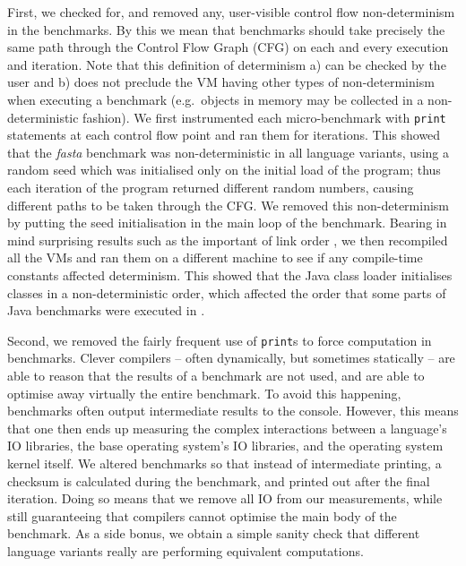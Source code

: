 \documentclass[10pt,preprint]{sigplanconf}
\newcommand{\fasta}{\emph{fasta}\xspace}
\begin{document}
First, we checked for, and removed any, user-visible control flow
non-determinism in the benchmarks. By this we mean that benchmarks should take
precisely the same path through the Control Flow Graph (CFG) on each and every
execution and iteration. Note that
this definition of determinism a) can be checked by the user and b) does not
preclude the VM having other types of non-determinism when executing a benchmark
(e.g.~objects in memory may be collected in a non-deterministic fashion). We
first instrumented each micro-benchmark with \texttt{print} statements at each
control flow point and ran them for  iterations. This showed that
the \fasta benchmark was non-deterministic in all language variants, using a random seed which was
initialised only on the initial load of the program; thus each iteration of the
program returned different random numbers, causing different paths to be taken
through the CFG. We removed this non-determinism by putting the seed
initialisation in the main loop of the benchmark. Bearing in mind surprising
results such as the important of link order \cite{mytkowicz09surprising}, we
then recompiled all the VMs and ran them on a different machine to see if any
compile-time constants affected determinism.  This showed that the Java class loader
initialises classes in a non-deterministic order, which affected the order that
some parts of Java benchmarks were executed in . 

 Second, we removed the fairly frequent use of
\texttt{print}s to force computation in benchmarks. Clever compilers -- often
dynamically, but sometimes statically -- are able to reason that the results of
a benchmark are not used, and are able to optimise away virtually the entire
benchmark. To avoid this happening, benchmarks often output intermediate results
to the console. However, this means that one then ends up measuring the complex
interactions between a language's IO libraries, the base operating system's IO
libraries, and the operating system kernel itself. We altered  benchmarks so that instead of intermediate printing, a checksum is
calculated during the benchmark, and printed out after the final iteration.
Doing so means that we remove all IO from our measurements, while still
guaranteeing that compilers cannot optimise the main body of the benchmark. As a
side bonus, we obtain a simple sanity check that different language variants
really are performing equivalent computations.
\end{document}
